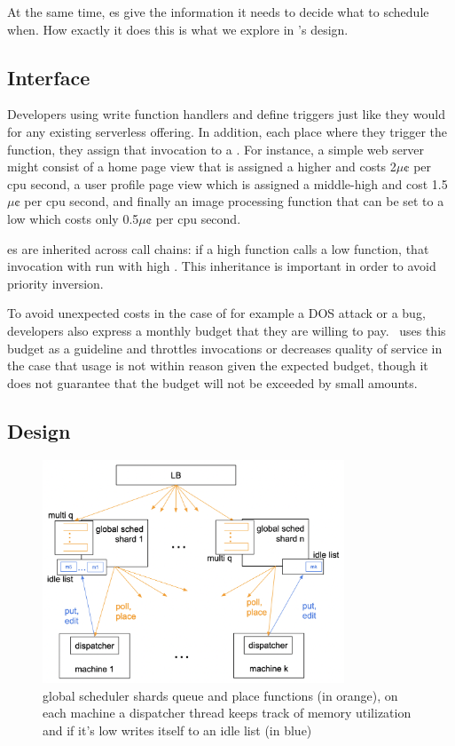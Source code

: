 At the same time, \class{}es give \sys{} the information it needs to decide what
to schedule when. How exactly it does this is what we explore in \sys{}'s
design.



\subsection{Interface}


Developers using \sys{} write function handlers and define triggers just like
they would for any existing serverless offering. In addition, each place where
they trigger the function, they assign that invocation to a \priceclass{}. For
instance, a simple web server might consist of a home page view that is assigned
a higher \priceclass{} and costs 2$\mu\cent$ per cpu second, a user profile page
view which is assigned a middle-high \class{} and cost 1.5$\mu\cent$ per cpu
second, and finally an image processing function that can be set to a low
\class{} which costs only 0.5$\mu\cent$ per cpu second.

\Class{}es are inherited across call chains: if a high \class{} function calls a
low \class{} function, that invocation with run with high \class{}. This
inheritance is important in order to avoid priority inversion.

To avoid unexpected costs in the case of for example a DOS attack or a bug,
developers also express a monthly budget that they are willing to pay.\ \sys{}
uses this budget as a guideline and throttles invocations or decreases quality
of service in the case that usage is not within reason given the expected
budget, though it does not guarantee that the budget will not be exceeded by
small amounts.



\subsection{\Sys{} Design}

\begin{figure}[t]
    \centering
      \includegraphics[width=9cm]{img/overview.png}
      \caption{ global scheduler shards queue and place functions (in orange), 
      on each machine a dispatcher thread keeps track of memory utilization 
      and if it's low writes itself to an idle list (in blue) }
    \label{fig:overview}
\end{figure}



